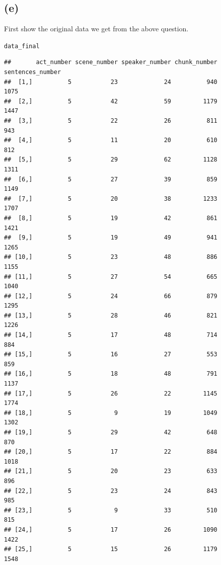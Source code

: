 \documentclass{article}\usepackage[]{graphicx}\usepackage[]{color}
\makeatletter
\newcommand{\hlstd}[1]{\textcolor[rgb]{0.345,0.345,0.345}{#1}}%
\newenvironment{kframe}{%
 \def\at@end@of@kframe{}%
 \ifinner\ifhmode%
  \def\at@end@of@kframe{\end{minipage}}%
  \begin{minipage}{\columnwidth}%
 \fi\fi%
 \def\FrameCommand##1{\hskip\@totalleftmargin \hskip-\fboxsep
 \colorbox{shadecolor}{##1}\hskip-\fboxsep
     \hskip-\linewidth \hskip-\@totalleftmargin \hskip\columnwidth}%
 \MakeFramed {\advance\hsize-\width
   \@totalleftmargin\z@ \linewidth\hsize
   \@setminipage}}%
 {\par\unskip\endMakeFramed%
 \at@end@of@kframe}
\newenvironment{knitrout}{}{} %
\makeatother
\begin{document}
\subsection{(e)}
First show the original data we get from the above question.
\begin{knitrout}
\color{fgcolor}\begin{kframe}
\begin{alltt}
\hlstd{data_final}
\end{alltt}
\begin{verbatim}
##       act_number scene_number speaker_number chunk_number sentences_number
##  [1,]          5           23             24          940             1075
##  [2,]          5           42             59         1179             1447
##  [3,]          5           22             26          811              943
##  [4,]          5           11             20          610              812
##  [5,]          5           29             62         1128             1311
##  [6,]          5           27             39          859             1149
##  [7,]          5           20             38         1233             1707
##  [8,]          5           19             42          861             1421
##  [9,]          5           19             49          941             1265
## [10,]          5           23             48          886             1155
## [11,]          5           27             54          665             1040
## [12,]          5           24             66          879             1295
## [13,]          5           28             46          821             1226
## [14,]          5           17             48          714              884
## [15,]          5           16             27          553              859
## [16,]          5           18             48          791             1137
## [17,]          5           26             22         1145             1774
## [18,]          5            9             19         1049             1302
## [19,]          5           29             42          648              870
## [20,]          5           17             22          884             1018
## [21,]          5           20             23          633              896
## [22,]          5           23             24          843              985
## [23,]          5            9             33          510              815
## [24,]          5           17             26         1090             1422
## [25,]          5           15             26         1179             1548

\end{verbatim}
\end{kframe}
\end{knitrout}
\end{document}

